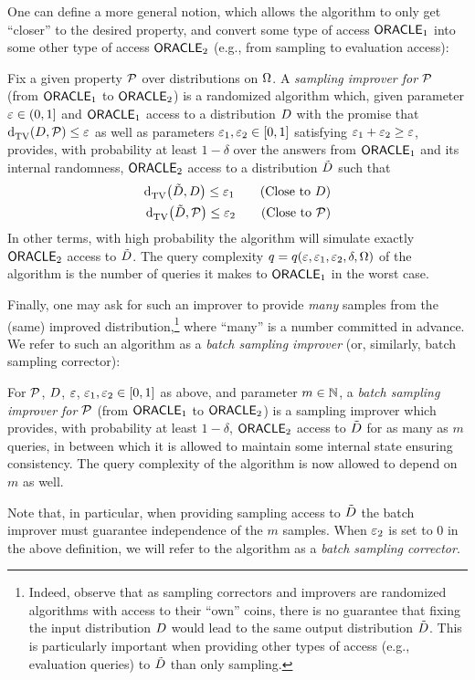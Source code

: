 One can define a more general notion, which allows the algorithm to only get ``closer'' to the desired property, and convert some type of access ${\sf ORACLE}_1$ into some other type of access ${\sf ORACLE}_2$ (e.g., from sampling to evaluation access):
\begin{definition}\label{def:sampling:corrector:general}
  Fix a given property $\mathcal{P}$ over distributions on ${\Omega}$. A \emph{sampling improver for $\mathcal{P}$} (from ${\sf ORACLE}_1$ to ${\sf ORACLE}_2$) is a randomized algorithm which, given parameter $\varepsilon\in(0,1]$ and ${\sf ORACLE}_1$ access to a distribution $D$ with the promise that ${\operatorname{d}_{\textrm{TV}}^{}\!\left({D, \mathcal{P}}\right)}\leq \varepsilon$ as well as parameters $\varepsilon_1,\varepsilon_2\in[0,1]$ satisfying $\varepsilon_1+\varepsilon_2\geq \varepsilon$, provides, with probability at least $1-\delta$ over the answers from ${\sf ORACLE}_1$ and its internal randomness, ${\sf ORACLE}_2$ access to a distribution $\tilde{D}$ such that
  \begin{align*}
    \totalvardist{\tilde{\D}}{\D} \leq \eps_1 \tag{Close to $\D$}\\
    \totalvardist{\tilde{\D}}{\property} \leq \eps_2 \tag{Close to \property}
  \end{align*}
  In other terms, with high probability the algorithm
   will simulate exactly ${\sf ORACLE}_2$ access to $\tilde{D}$. The query complexity $q=q(\varepsilon,\varepsilon_1,\varepsilon_2,\delta,{\Omega})$ of the algorithm is the number of queries it makes to ${\sf ORACLE}_1$ in the worst case.
\end{definition}

Finally, one may ask for such an improver to provide \emph{many} samples from the (same) improved distribution,\footnote{Indeed, observe that as sampling correctors and improvers are randomized algorithms with access to their ``own'' coins, there is no guarantee that fixing the input distribution $D$ would lead to the same output distribution $\tilde{D}$. This is particularly important when providing other types of access (e.g., evaluation queries) to $\tilde{D}$ than only sampling.} where ``many'' is a number committed in advance. We refer to such an algorithm as a \emph{batch sampling improver} {(or, similarly, batch sampling corrector):}
\begin{definition}\label{def:sampling:corrector:batch}
  For $\mathcal{P}$, $D$, $\varepsilon$, $\varepsilon_1,\varepsilon_2\in[0,1]$ as above, and parameter $m\in\mathbb{N}$, a \emph{batch sampling improver for $\mathcal{P}$} (from ${\sf ORACLE}_1$ to ${\sf ORACLE}_2$) is a sampling improver which provides, with probability at least $1-\delta$, ${\sf ORACLE}_2$ access to $\tilde{D}$ for as many as $m$ queries, in between which it is allowed to maintain some internal state ensuring consistency. The query complexity of the algorithm is now allowed to depend on $m$ as well.
  
  \noindent Note that, in particular, when providing sampling access to $\tilde{D}$ the batch improver must guarantee independence of the $m$ samples. When $\varepsilon_2$ is set to 0 in the above definition, we will refer to the algorithm as a \emph{batch sampling corrector}.
\end{definition}

